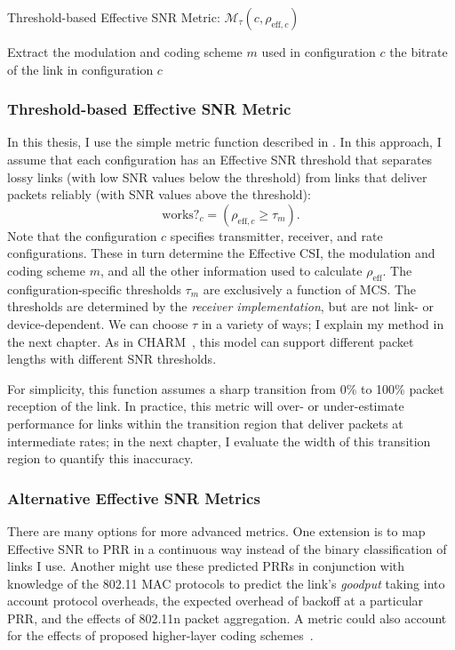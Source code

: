 \begin{algorithm}[tp]
\caption{\label{alg:threshold_metric}Threshold-based Effective SNR Metric: $\mathcal{M}_\tau(c,\rho_{\text{eff},c})$}
\begin{algorithmic}[1]
\STATE Extract the modulation and coding scheme $m$ used in configuration $c$
\RETURN the bitrate of the link in configuration $c$   
\ELSE
{} 
\ENDIF
\end{algorithmic}
\end{algorithm}
\subsubsection{Threshold-based Effective SNR Metric}
In this thesis, I use the simple  metric function described in . In this approach, I assume that each configuration has an Effective SNR threshold that separates lossy links (with low SNR values below the threshold) from links that deliver packets reliably (with SNR values above the threshold):
\begin{equation}
\label{eq:threshold}
\text{works?}_c = (\rho_{\text{eff},c} \geq \tau_m).
\end{equation}
Note that the configuration $c$ specifies transmitter, receiver, and rate configurations. These in turn determine the Effective CSI, the modulation and coding scheme $m$, and all the other information used to calculate $\rho_\text{eff}$. The configuration-specific thresholds $\tau_m$ are exclusively a function of MCS. The thresholds are determined by the \emph{receiver implementation}, but are not link- or device-dependent. We can choose $\tau$ in a variety of ways; I explain my method in the next chapter. As in CHARM~\cite{Judd_CHARM}, this model can support different packet lengths with different SNR thresholds.

For simplicity, this function assumes a sharp transition from 0\% to 100\% packet reception of the link. In practice, this metric will over- or under-estimate performance for links within the transition region that deliver packets at intermediate rates; in the next chapter, I evaluate the width of this transition region to quantify this inaccuracy.

\subsubsection{Alternative Effective SNR Metrics}
There are many options for more advanced metrics. One extension is to map Effective SNR to PRR in a continuous way instead of the binary classification of links I use. Another might use these predicted PRRs in conjunction with knowledge of the 802.11 MAC protocols to predict the link's \emph{goodput} taking into account protocol overheads, the expected overhead of backoff at a particular PRR, and the effects of 802.11n packet aggregation. A metric could also account for the effects of proposed higher-layer coding schemes~\cite{Gudipati_Strider,Perry_Spinal,Lin_ZipTX}.

